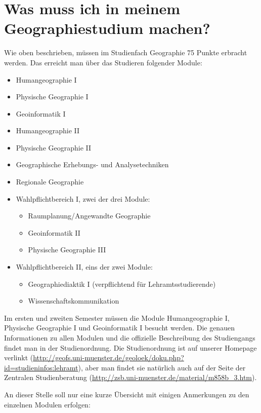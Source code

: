\section*{Was muss ich in meinem Geographiestudium machen?}
Wie oben beschrieben, müssen im Studienfach Geographie 75 Punkte erbracht werden. Das erreicht man über das Studieren folgender Module:
\begin{itemize}
	\item Humangeographie I
	\item Physische Geographie I
	\item Geoinformatik I
	\item Humangeographie II
	\item Physische Geographie II	
	\item Geographische Erhebungs- und Analysetechniken
	\item Regionale Geographie
	\item Wahlpflichtbereich I, zwei der drei Module:
		\begin{itemize}
			\item Raumplanung/Angewandte Geographie
			\item Geoinformatik II
			\item Physische Geographie III 
		\end{itemize}
	\item Wahlpflichtbereich II, eins der zwei Module:
		\begin{itemize}
			\item Geographiediaktik I (verpflichtend für Lehramtsstudierende)
			\item Wissenschaftskommunikation
		\end{itemize}
\end{itemize}
Im ersten und zweiten Semester müssen die Module Humangeographie I, Physische Geographie I und Geoinformatik I besucht werden. Die genauen Informationen zu allen Modulen und die offizielle Beschreibung des Studiengangs findet man in der Studienordnung. Die Studienordnung ist auf unserer Homepage verlinkt (\url{http://geofs.uni-muenster.de/geoloek/doku.php?id=studieninfos:lehramt}), aber man findet sie natürlich auch auf der Seite der Zentralen Studienberatung (\url{http://zsb.uni-muenster.de/material/m858b_3.htm}).

An dieser Stelle soll nur eine kurze Übersicht mit einigen Anmerkungen zu den einzelnen Modulen erfolgen:
